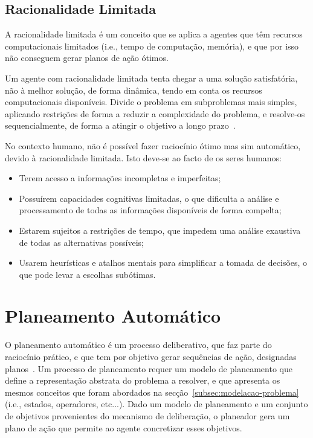 \subsection{Racionalidade Limitada}\label{subsec:racionalidade-limitada}

A racionalidade limitada é um conceito que se aplica a agentes que têm recursos computacionais limitados (i.e., tempo de computação, memória), e que por isso não conseguem gerar planos de ação ótimos.

Um agente com racionalidade limitada tenta chegar a uma solução satisfatória, não à melhor solução, de forma dinâmica, tendo em conta os recursos computacionais disponíveis.
Divide o problema em subproblemas mais simples, aplicando restrições de forma a reduzir a complexidade do problema, e resolve-os sequencialmente, de forma a atingir o objetivo a longo prazo~\cite{isel:iasa:slides:arq-agentes-deliberativos}.

No contexto humano, não é possível fazer raciocínio ótimo mas sim automático, devido à racionalidade limitada.
Isto deve-se ao facto de os seres humanos:

\begin{itemize}
    \item Terem acesso a informações incompletas e imperfeitas;
    \item Possuírem capacidades cognitivas limitadas, o que dificulta a análise e processamento de todas as informações disponíveis de forma compelta;
    \item Estarem sujeitos a restrições de tempo, que impedem uma análise exaustiva de todas as alternativas possíveis;
    \item Usarem heurísticas e atalhos mentais para simplificar a tomada de decisões, o que pode levar a escolhas subótimas.
\end{itemize}


\section{Planeamento Automático}\label{sec:planeamento-automatico}

O planeamento automático é um processo deliberativo, que faz parte do raciocínio prático, e que tem por objetivo
gerar sequências de ação, designadas planos~\cite{isel:iasa:slides:plan-autom-pee}.
Um processo de planeamento requer um modelo de planeamento que define a representação abstrata do problema a resolver, e que apresenta os mesmos conceitos que foram abordados na secção~\ref{subsec:modelacao-problema} (i.e., estados, operadores, etc...).
Dado um modelo de planeamento e um conjunto de objetivos provenientes do mecanismo de deliberação, o planeador gera um plano de ação que permite ao agente concretizar esses objetivos.

